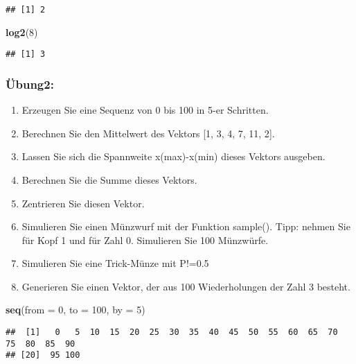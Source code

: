 \documentclass[
]{article}
\newenvironment{Shaded}{\begin{snugshade}}{\end{snugshade}}
\newcommand{\AttributeTok}[1]{\textcolor[rgb]{0.13,0.29,0.53}{#1}}
\newcommand{\DecValTok}[1]{\textcolor[rgb]{0.00,0.00,0.81}{#1}}
\newcommand{\FunctionTok}[1]{\textcolor[rgb]{0.13,0.29,0.53}{\textbf{#1}}}
\newcommand{\NormalTok}[1]{#1}
\providecommand{\tightlist}{%
  \setlength{\itemsep}{0pt}\setlength{\parskip}{0pt}}
\begin{document}
\begin{verbatim}
## [1] 2
\end{verbatim}

\begin{Shaded}
\begin{Highlighting}[]
\FunctionTok{log2}\NormalTok{(}\DecValTok{8}\NormalTok{)}
\end{Highlighting}
\end{Shaded}

\begin{verbatim}
## [1] 3
\end{verbatim}

\hypertarget{uxfcbung2}{%
\subsubsection{Übung2:}\label{uxfcbung2}}

\begin{enumerate}
\def\labelenumi{\arabic{enumi}.}
\tightlist
\item
  Erzeugen Sie eine Sequenz von 0 bis 100 in 5-er Schritten.
\item
  Berechnen Sie den Mittelwert des Vektors {[}1, 3, 4, 7, 11, 2{]}.
\item
  Lassen Sie sich die Spannweite x(max)-x(min) dieses Vektors ausgeben.
\item
  Berechnen Sie die Summe dieses Vektors.
\item
  Zentrieren Sie diesen Vektor.
\item
  Simulieren Sie einen Münzwurf mit der Funktion sample(). Tipp: nehmen
  Sie für Kopf 1 und für Zahl 0. Simulieren Sie 100 Münzwürfe.
\item
  Simulieren Sie eine Trick-Münze mit P!=0.5
\item
  Generieren Sie einen Vektor, der aus 100 Wiederholungen der Zahl 3
  besteht.
\end{enumerate}

\begin{Shaded}
\begin{Highlighting}[]
\FunctionTok{seq}\NormalTok{(}\AttributeTok{from =} \DecValTok{0}\NormalTok{, }\AttributeTok{to =} \DecValTok{100}\NormalTok{, }\AttributeTok{by =} \DecValTok{5}\NormalTok{)}
\end{Highlighting}
\end{Shaded}

\begin{verbatim}
##  [1]   0   5  10  15  20  25  30  35  40  45  50  55  60  65  70  75  80  85  90
## [20]  95 100
\end{verbatim}
\end{document}
